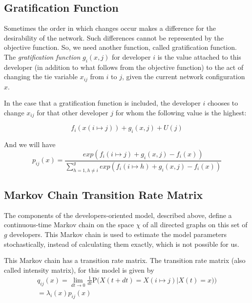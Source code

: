 \documentclass[12pt,letterpaper]{gthesis2}  %
\begin{document}
\subsection*{Gratification Function}
Sometimes the order in which changes occur makes a difference for the desirability of the network. Such differences cannot be represented by the objective function. So, we need another function, called gratification function. \\

The \textit{gratification function} $g_i(x,j)$ for developer $i$ is the value attached to this developer (in addition to what follows from the objective function) to the act of changing the tie variable $x_{ij}$ from $i$ to $j$, given the current network configuration $x$. 

In the case that a gratification function is included, the developer $i$ chooses to change $x_{ij}$ for that other developer $j$ for whom the following value \cite{Snijders2004} is the highest:

\begin{equation}
f_i(x(i \mapsto j)) + g_i(x, j) + U(j)
\end{equation} 

And we will have 
\begin{equation}
\label{ObjectiveFunctionWithGratification}
p_{ij}(x) = \frac{exp(f_i(i \mapsto j) + g_i(x, j) - f_i(x))}{\sum_{h=1, h \neq i}^{g} exp(f_i(i \mapsto h) + g_i(x, j) - f_i(x))}
\end{equation}

\subsection*{Markov Chain Transition Rate Matrix}
The components of the developers-oriented model, described above, define a continuous-time Markov chain on the space $\chi$ of all directed graphs on this set of $g$ developers. This Markov chain is used to estimate the model parameters stochastically, instead of calculating them exactly, which is not possible for us.

This Markov chain has a transition rate matrix. The transition rate matrix (also called intensity matrix), for this model is given by 
\begin{multline}
\label{intensityMatrix}
q_{ij}(x) = \lim_{dt \to 0} \frac{1}{dt} \mathrm {P} \big({X(t + dt) = X(i \mapsto j) | X(t) = x)}\big) \\ = \lambda_i(x) p_{ij}(x)
\end{multline}
\end{document}
